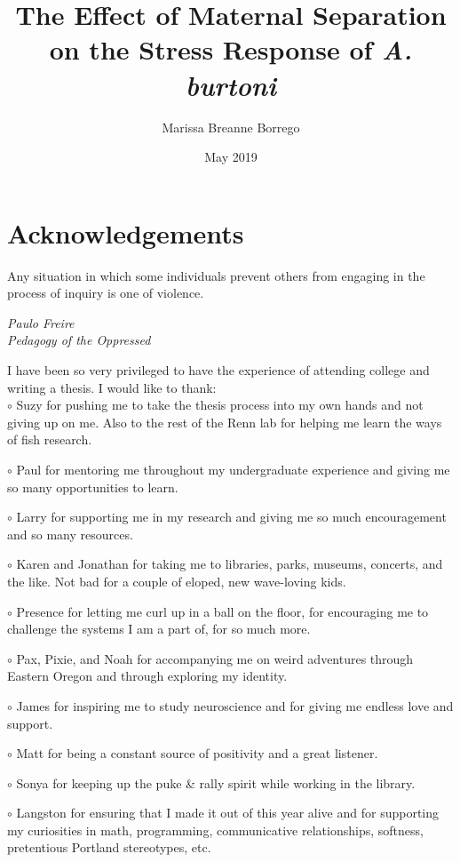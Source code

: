 \documentclass[12pt,twoside]{reedthesis}
\title{The Effect of Maternal Separation on the Stress Response of
  \textit{A. burtoni}}
\author{Marissa Breanne Borrego}
\date{May 2019}
\begin{document}
  \maketitle
  \frontmatter %
  \pagestyle{empty} %

    \chapter*{Acknowledgements}
	\epigraph{Any situation in which some individuals prevent others from engaging in the process of inquiry is one of violence.}{\textit{Paulo Freire \\ Pedagogy of the Oppressed}}
	
	I have been so very privileged to have the experience of attending college and
  writing a thesis. I would like to thank:\\
	
$\circ$ Suzy for pushing me to take the thesis process into my own hands and not
  giving up on me. Also to the rest of the Renn lab for helping me learn the ways of fish research.

 $\circ$ Paul for mentoring me throughout my undergraduate experience and giving me so many opportunities to learn. 	
  
$\circ$ Larry for supporting me in my research and giving me so much encouragement and
  so many resources. 

 $\circ$ Karen and Jonathan for taking me to libraries, parks, museums, concerts, and the like.
  Not bad for a couple of eloped, new wave-loving kids. 
	
	$\circ$ Presence for
  letting me curl up in a ball on the floor, for
  encouraging me to challenge the systems I am a part of, for so much more.

 $\circ$ Pax, Pixie, and Noah for accompanying me on weird adventures through Eastern
  Oregon and through exploring my identity.
	
$\circ$ James for inspiring me to study neuroscience and for giving me endless love
  and support.

 $\circ$ Matt for being a constant source of positivity and a great listener.

$\circ$ Sonya for keeping up the puke \& rally spirit while working in the library.

 $\circ$ Langston for ensuring that I made it out of this year alive and for supporting my curiosities in math, programming, communicative
  relationships, softness, pretentious Portland stereotypes, etc.
\end{document}
